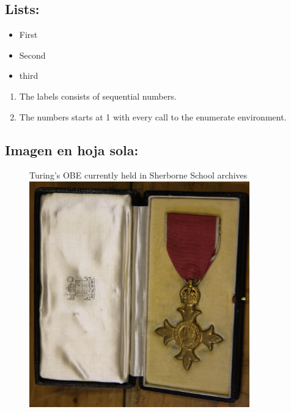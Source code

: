 \documentclass{article}
\begin{document}
  \subsection{Lists:}
    \begin{itemize}
      \item{First}
      \item{Second}
      \item{third}
    \end{itemize}
    \begin{enumerate}
      \item The labels consists of sequential numbers.
      \item The numbers starts at 1 with every call to the enumerate environment.
    \end{enumerate}
  \subsection{Imagen en hoja sola:}
    \pagebreak

    \begin{figure}
      Turing's OBE currently held in Sherborne School archives
      \centering
      \includegraphics[width=0.85\textwidth]{OBE}
    \end{figure}
\end{document}
